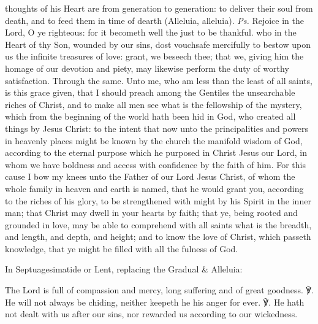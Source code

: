 \introit
{} thoughts of his Heart are from generation to generation: to deliver their soul from death, and to feed them in time of dearth (Alleluia, alleluia). \textit{Ps.} Rejoice in the Lord, O ye righteous: for it becometh well the just to be thankful.
\collect
{} who in the Heart of thy Son, wounded by our sins, dost vouchsafe mercifully to bestow upon us the infinite treasures of love: grant, we beseech thee; that we, giving him the homage of our devotion and piety, may likewise perform the duty of worthy satisfaction. Through the same.
 Unto me, who am less than the least of all saints, is this grace given, that I should preach among the Gentiles the unsearchable riches of Christ, and to make all men see what is the fellowship of the mystery, which from the beginning of the world hath been hid in God, who created all things by Jesus Christ: to the intent that now unto the principalities and powers in heavenly places might be known by the church the manifold wisdom of God, according to the eternal purpose which he purposed in Christ Jesus our Lord, in whom we have boldness and access with confidence by the faith of him. For this cause I bow my knees unto the Father of our Lord Jesus Christ, of whom the whole family in heaven and earth is named, that he would grant you, according to the riches of his glory, to be strengthened with might by his Spirit in the inner man; that Christ may dwell in your hearts by faith; that ye, being rooted and grounded in love, may be able to comprehend with all saints what is the breadth, and length, and depth, and height; and to know the love of Christ, which passeth knowledge, that ye might be filled with all the fulness of God.
\begin{rubric}
{In Septuagesimatide or Lent, replacing the Gradual \& Alleluia:}
\end{rubric}\par\noindent
The Lord is full of compassion and mercy, long suffering and of great goodness. ℣. He will not always be chiding, neither keepeth he his anger for ever. ℣. He hath not dealt with us after our sins, nor rewarded us according to our wickedness.

